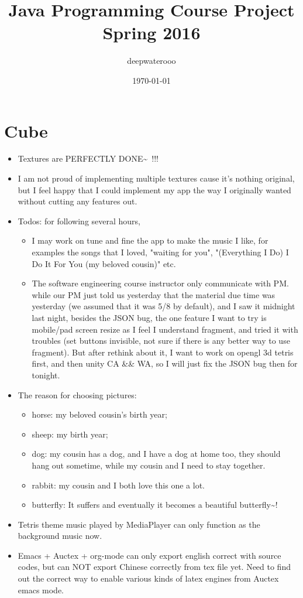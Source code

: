 \documentclass[9pt,b5paper]{article}
\author{deepwaterooo}
\date{\today}
\title{Java Programming Course Project Spring 2016}
\begin{document}
\maketitle
\tableofcontents


\section{Cube}
\label{sec-1}
\begin{itemize}
\item Textures are PERFECTLY DONE\textasciitilde{}~!!!
\item I am not proud of implementing multiple textures cause it's nothing original, but I feel happy that I could implement my app the way I originally wanted without cutting any features out.
\item Todos: for following several hours, 
\begin{itemize}
\item I may work on tune and fine the app to make the music I like, for examples the songs that I loved, "waiting for you", "(Everything I Do) I Do It For You (my beloved cousin)" etc.
\item The software engineering course instructor only communicate with PM. while our PM just told us yesterday that the material due time was yesterday (we assumed that it was 5/8 by default), and I saw it midnight last night, besides the JSON bug, the one feature I want to try is mobile/pad screen resize as I feel I understand fragment, and tried it with troubles (set buttons invisible, not sure if there is any better way to use fragment). But after rethink about it, I want to work on opengl 3d tetris first, and then unity CA \&\& WA, so I will just fix the JSON bug then for tonight.
\end{itemize}
\item The reason for choosing pictures: 
\begin{itemize}
\item horse: my beloved cousin's birth year;
\item sheep: my birth year;
\item dog: my cousin has a dog, and I have a dog at home too, they should hang out sometime, while my cousin and I need to stay together.
\item rabbit: my cousin and I both love this one a lot.
\item butterfly: It suffers and eventually it becomes a beautiful butterfly\textasciitilde{}!
\end{itemize}
\item Tetris theme music played by MediaPlayer can only function as the background music now.
\item Emacs + Auctex + org-mode can only export english correct with source codes, but can NOT export Chinese correctly from tex file yet. Need to find out the correct way to enable various kinds of latex engines from Auctex emacs mode.
\end{itemize}
\end{document}
